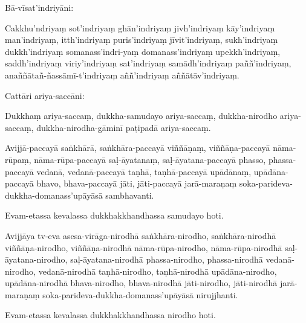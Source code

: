 Bā-vīsat'indriyāni:

Cakkhu'ndriyaṃ sot'indriyaṃ ghān'indriyaṃ jivh'indriyaṃ kāy'indriyaṃ
man'indriyaṃ, itth'indriyaṃ puris'indriyaṃ jīvit'indriyaṃ, sukh'indriyaṃ
dukkh'indriyaṃ somanass'indri-yaṃ domanass'indriyaṃ upekkh'indriyaṃ,
saddh'indriyaṃ viriy'indriyaṃ sat'indriyaṃ samādh'indriyaṃ
paññ'indriyaṃ, anaññātañ-ñassāmī-t'indriyaṃ aññ'indriyaṃ
aññātāv'indriyaṃ.

\enlargethispage{\baselineskip}

Cattāri ariya-saccāni:

Dukkhaṃ ariya-saccaṃ, dukkha-samudayo ariya-saccaṃ, dukkha-nirodho
ariya-saccaṃ, dukkha-nirodha-gāminī paṭipadā ariya-saccaṃ.

Avijjā-paccayā saṅkhārā, saṅkhāra-paccayā viññāṇaṃ, viññāṇa-paccayā
nāma-rūpaṃ, nāma-rūpa-paccayā saḷ-āyatanaṃ, saḷ-āyatana-paccayā phasso,
phassa-paccayā vedanā, vedanā-paccayā taṇhā, taṇhā-paccayā upādānaṃ,
upādāna-paccayā bhavo, bhava-paccayā jāti, jāti-paccayā jarā-maraṇaṃ
soka-parideva-dukkha-domanass'upāyāsā sambhavanti.

Evam-etassa kevalassa dukkhakkhandhassa samudayo hoti.

Avijjāya tv-eva asesa-virāga-nirodhā saṅkhāra-nirodho, saṅkhāra-nirodhā
viññāṇa-nirodho, viññāṇa-nirodhā nāma-rūpa-nirodho, nāma-rūpa-nirodhā
saḷ-āyatana-nirodho, saḷ-āyatana-nirodhā phassa-nirodho, phassa-nirodhā
vedanā-nirodho, vedanā-nirodhā taṇhā-nirodho, taṇhā-nirodhā
upādāna-nirodho, upādāna-nirodhā bhava-nirodho, bhava-nirodhā
jāti-nirodho, jāti-nirodhā jarā-maraṇaṃ
soka-parideva-dukkha-domanass'upāyāsā nirujjhanti.

Evam-etassa kevalassa dukkhakkhandhassa nirodho hoti.

